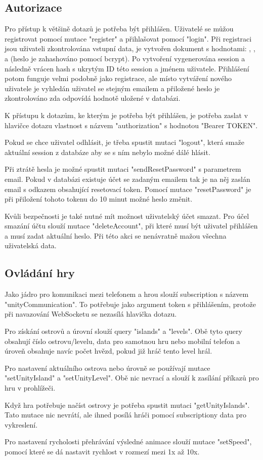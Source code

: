 \subsection{Autorizace}
Pro přístup k většině dotazů je potřeba být přihlášen. Uživatelé se můžou registrovat pomocí mutace "register" a přihlašovat pomocí "login". Při registraci jsou uživateli zkontrolována vstupní data, je vytvořen dokument s hodnotami: , ,  a  (heslo je zahashováno pomocí bcrypt\cite{bcrypt}). Po vytvoření vygenerována session a následně vrácen hash s ukrytým ID této session a jménem uživatele. Přihlášení potom funguje velmi podobně jako registrace, ale místo vytváření nového uživatele je vyhledán uživatel se stejným emailem a přiložené heslo je zkontrolováno zda odpovídá hodnotě uložené v databázi.\par
K přístupu k dotazům, ke kterým je potřeba být přihlášen, je potřeba zaslat v hlavičce dotazu vlastnost s názvem "authorization" s hodnotou "Bearer TOKEN".\par
Pokud se chce uživatel odhlásit, je třeba spustit mutaci "logout", která smaže aktuální session z databáze aby se s ním nebylo možné dálé hlásit.\par
Při ztrátě hesla je možné spustit mutaci "sendResetPassword" s parametrem email. Pokud v databázi existuje účet se zadaným emailem tak je na něj zaslán email s odkazem obsahující resetovací token. Pomocí mutace "resetPassword" je při přiložení tohoto tokenu do 10 minut možné heslo změnit.\par
Kvůli bezpečnosti je také nutné mít možnost uživatelský účet smazat. Pro účel smazání účtu slouží mutace "deleteAccount", při které musí být uživatel přihlášen a musí zadat aktuální heslo. Při této akci se nenávratně mažou všechna uživatelská data.

\subsection{Ovládání hry}
Jako jádro pro komunikaci mezi telefonem a hrou slouží subscription s názvem "unityCommunication". To potřebuje jako argument token s přihlášením, protože při navazování WebSocketu se nezasílá hlavička dotazu.\par
Pro získání ostrovů a úrovní slouží query "islands" a "levels". Obě tyto query obsahují číslo ostrovu/levelu, data pro samotnou hru nebo mobilní telefon a úroveň obsahuje navíc počet hvězd, pokud již hráč tento level hrál.\par
Pro nastavení aktuálního ostrova nebo úrovně se používají mutace "setUnityIsland" a "setUnityLevel". Obě nic nevrací a slouží k zasílání příkazů pro hru v prohlížeči.\par
Když hra potřebuje načíst ostrovy je potřeba spustit mutaci "getUnityIslands". Tato mutace nic nevrátí, ale ihned posílá hráči pomocí subscriptiony data pro vykreslení.\par
Pro nastavení rycholosti přehrávání výsledné animace slouží mutace "setSpeed", pomocí které se dá nastavit rychlost v rozmezí mezi 1x až 10x.


